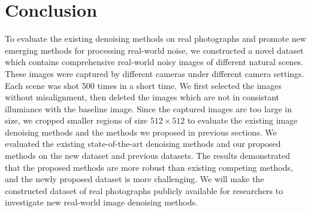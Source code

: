 \section{Conclusion}

To evaluate the existing denoising methods on real photographs and promote new emerging methods for processing real-world noise, we constructed a novel dataset which contains comprehensive real-world noisy images of different natural scenes. These images were captured by different cameras under different camera settings. Each scene was shot 500 times in a short time. We first selected the images without misalignment, then deleted the images which are not in consistant illumiance with the baseline image. Since the captured images are too large in size, we cropped smaller regions of size $512\times512$ to evaluate the existing image denoising methods and the methods we proposed in  previous sections. We evaluated the existing state-of-the-art denoising methods and our proposed methods on the new dataset and previous datasets. The results demonstrated that the proposed methods are more robust than existing competing methods, and the newly proposed dataset is more challenging. We will make the constructed dataset of real photographs publicly available for researchers to investigate new real-world image denoising methods.


















